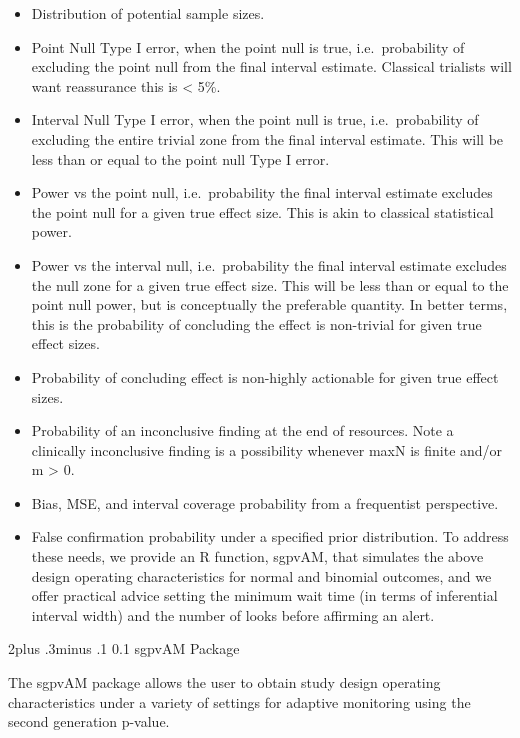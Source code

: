 \documentclass[12pt,oneside]{book}
\makeatletter
\providecommand{\tightlist}{%
  \setlength{\itemsep}{0pt}\setlength{\parskip}{0pt}}
\newlength{\li}\setlength{\li}{14.48pt}
\newlength{\di}\setlength{\di}{-3.5mm}
\renewcommand\section{ \@startsection {section}{1}{\z@}%
    {2\@bls  plus .3\@bls minus .1\@bls}%
    {0.1\@bls}%
    {\centering\normalfont}}
\theoremstyle{definition}
\theoremstyle{definition}
\theoremstyle{definition}
\theoremstyle{remark}
\makeatother
\begin{document}
\begin{itemize}
\tightlist
\item
  Distribution of potential sample sizes.
\item
  Point Null Type I error, when the point null is true, i.e.~probability
  of excluding the point null from the final interval estimate.
  Classical trialists will want reassurance this is \textless{} 5\%.
\item
  Interval Null Type I error, when the point null is true,
  i.e.~probability of excluding the entire trivial zone from the final
  interval estimate. This will be less than or equal to the point null
  Type I error.
\item
  Power vs the point null, i.e.~probability the final interval estimate
  excludes the point null for a given true effect size. This is akin to
  classical statistical power.
\item
  Power vs the interval null, i.e.~probability the final interval
  estimate excludes the null zone for a given true effect size. This
  will be less than or equal to the point null power, but is
  conceptually the preferable quantity. In better terms, this is the
  probability of concluding the effect is non-trivial for given true
  effect sizes.
\item
  Probability of concluding effect is non-highly actionable for given
  true effect sizes.
\item
  Probability of an inconclusive finding at the end of resources. Note a
  clinically inconclusive finding is a possibility whenever maxN is
  finite and/or m \textgreater{} 0.
\item
  Bias, MSE, and interval coverage probability from a frequentist
  perspective.
\item
  False confirmation probability under a specified prior distribution.
  To address these needs, we provide an R function, sgpvAM, that
  simulates the above design operating characteristics for normal and
  binomial outcomes, and we offer practical advice setting the minimum
  wait time (in terms of inferential interval width) and the number of
  looks before affirming an alert.
\end{itemize}

\hypertarget{sgpvam-package}{%
\section{sgpvAM Package}\label{sgpvam-package}}

The sgpvAM package allows the user to obtain study design operating
characteristics under a variety of settings for adaptive monitoring
using the second generation p-value.
\end{document}
